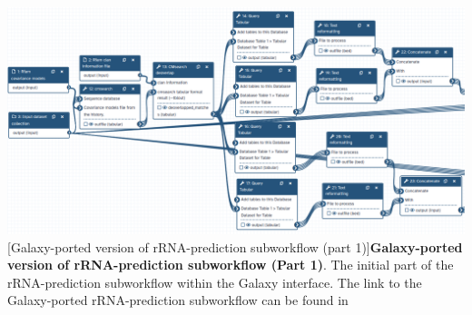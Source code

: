 \begin{landscape}

\begin{center}
  \includegraphics[width=\paperwidth,height=\paperheight,keepaspectratio]{figures/Galaxy_WF_part1.png}
  [Galaxy-ported version of rRNA-prediction subworkflow (part 1)]{\textbf{Galaxy-ported version of rRNA-prediction subworkflow (Part 1)}. The initial part of the rRNA-prediction subworkflow within the Galaxy interface. The link to the Galaxy-ported rRNA-prediction subworkflow can be found in } \label{fig:Galaxy_WF_part1}%
\end{center}

\end{landscape}
